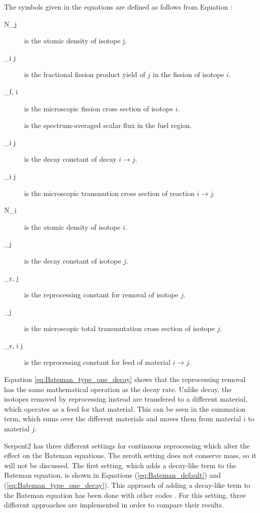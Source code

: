 The symbols given in the equations are defined as follows from Equation \cite{leppanen_development_2007}:
\begin{description}
\item[N_j] is the atomic density of isotope j.
\item[\gamma_{i \rightarrow j}] is the fractional fission product yield of $j$ in the fission of isotope $i$.
\item[\sigma_{f, i}] is the microscopic fission cross section of isotope $i$.
\item[\Phi] is the spectrum-averaged scalar flux in the fuel region.
\item[\lambda _{i \rightarrow j}] is the decay constant of decay $i \rightarrow j$.
\item[\sigma_{i \rightarrow j}] is the microscopic transmution cross section of reaction $i \rightarrow j$.
\item[N_i] is the atomic density of isotope $i$.
\item[\lambda_j] is the decay constant of isotope $j$.
\item[\lambda_{r, j}] is the reprocessing constant for removal of isotope $j$.
\item[\sigma_j] is the microscopic total transmutation cross section of isotope $j$.
\item[\lambda _{r, i \rightarrow j}] is the reprocessing constant for feed of material $i \rightarrow j$.
\end{description}

Equation \eqref{eq:Bateman_type_one_decay} shows that the reprocessing removal has the same mathematical operation as the decay rate. Unlike decay, the isotopes removed by reprocessing instead are transfered to a different material, which operates as a feed for that material. This can be seen in the summation term, which sums over the different materials and moves them from material $i$ to material $j$.

Serpent2 has three different settings for continuous reprocessing which alter the effect on the Bateman equations. The zeroth setting does not conserve mass, so it will not be discussed. The first setting, which adds a decay-like term to the Bateman equation, is shown in Equations (\ref{eq:Bateman_default}) and (\ref{eq:Bateman_type_one_decay}). This approach of adding a decay-like term to the Bateman equation has been done with other codes \cite{jr_vicente_valdez_modeling_2020, rodriguez-vieitez_transmutation_2002}. For this setting, three different approaches are implemented in order to compare their results.


